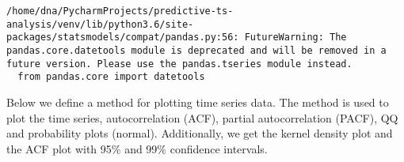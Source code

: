 \documentclass[11pt]{article}
\begin{document}
    \begin{Verbatim}[commandchars=\\\{\}]
/home/dna/PycharmProjects/predictive-ts-analysis/venv/lib/python3.6/site-packages/statsmodels/compat/pandas.py:56: FutureWarning: The pandas.core.datetools module is deprecated and will be removed in a future version. Please use the pandas.tseries module instead.
  from pandas.core import datetools

    \end{Verbatim}

    Below we define a method for plotting time series data. The method is
used to plot the time series, autocorrelation (ACF), partial
autocorrelation (PACF), QQ and probability plots (normal). Additionally,
we get the kernel density plot and the ACF plot with 95\% and 99\%
confidence intervals.
\end{document}
